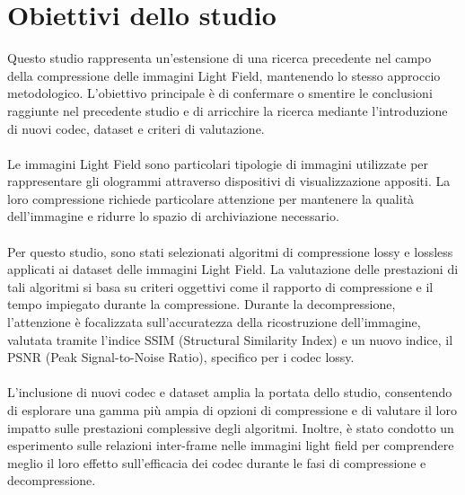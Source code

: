 \section{Obiettivi dello studio}
Questo studio rappresenta un'estensione di una ricerca precedente nel campo della compressione delle immagini Light Field, mantenendo lo stesso approccio metodologico. L'obiettivo principale è di confermare o smentire le conclusioni raggiunte nel precedente studio e di arricchire la ricerca mediante l'introduzione di nuovi codec, dataset e criteri di valutazione.
\\
\\
Le immagini Light Field sono particolari tipologie di immagini utilizzate per rappresentare gli ologrammi attraverso dispositivi di visualizzazione appositi. La loro compressione richiede particolare attenzione per mantenere la qualità dell'immagine e ridurre lo spazio di archiviazione necessario.
\\
\\
Per questo studio, sono stati selezionati algoritmi di compressione lossy e lossless applicati ai dataset delle immagini Light Field. La valutazione delle prestazioni di tali algoritmi si basa su criteri oggettivi come il rapporto di compressione e il tempo impiegato durante la compressione. Durante la decompressione, l'attenzione è focalizzata sull'accuratezza della ricostruzione dell'immagine, valutata tramite l'indice SSIM (Structural Similarity Index) e un nuovo indice, il PSNR (Peak Signal-to-Noise Ratio), specifico per i codec lossy.
\\
\\
L'inclusione di nuovi codec e dataset amplia la portata dello studio, consentendo di esplorare una gamma più ampia di opzioni di compressione e di valutare il loro impatto sulle prestazioni complessive degli algoritmi. Inoltre, è stato condotto un esperimento sulle relazioni inter-frame nelle immagini light field per comprendere meglio il loro effetto sull'efficacia dei codec durante le fasi di compressione e decompressione.
